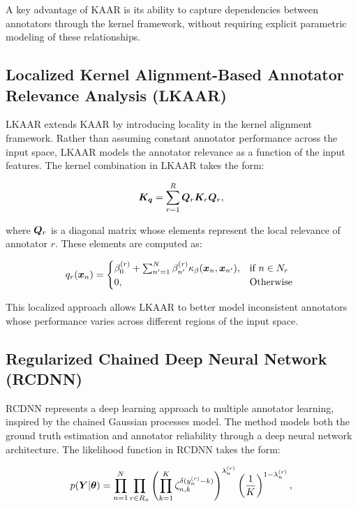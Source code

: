 A key advantage of KAAR is its ability to capture dependencies
between annotators through the kernel framework, without requiring
explicit parametric modeling of these relationships.

\subsection{Localized Kernel Alignment-Based Annotator Relevance
Analysis (LKAAR)}

LKAAR extends KAAR by introducing locality in the kernel alignment
framework. Rather than assuming constant annotator performance across
the input space, LKAAR models the annotator relevance as a function
of the input features. The kernel combination in LKAAR takes the form:

\begin{equation}
  {\bm{K}}_{{\bm{q}}} =\sum_{r=1}^{R}{\bm{Q}}_r{\bm{K}}_r{\bm{Q}}_r,
\end{equation}

where ${\bm{Q}}_r$ is a diagonal matrix whose elements represent the
local relevance of annotator $r$. These elements are computed as:

\begin{align}
  q_r({\bm{x}}_n) =
  \begin{cases}
    \beta_0^{(r)} + \sum_{n^{\prime}=1}^{N}\beta_{n^{\prime}}^{(r)}
    \kappa_{\beta}({\bm{x}}_n,{\bm{x}}_{n^{\prime}}), & \mbox{if } n\in N_r\\
    0, & \mbox{Otherwise }
  \end{cases}
\end{align}

This localized approach allows LKAAR to better model inconsistent
annotators whose performance varies across different regions of the input space.

\subsection{Regularized Chained Deep Neural Network (RCDNN)}

RCDNN represents a deep learning approach to multiple annotator
learning, inspired by the chained Gaussian processes model. The
method models both the ground truth estimation and annotator
reliability through a deep neural network architecture. The
likelihood function in RCDNN takes the form:

\begin{align}
  p({\bm{Y}}|\bm{\theta}) = \prod_{n=1}^{N}\prod_{r\in R_n}
  \left(\prod_{k=1}^{K}\zeta_{n,k}^{\delta(y_n^{(r)}-k)}\right)^{\lambda_n^{(r)}}\left(\frac{1}{K}\right)^{1-\lambda_n^{(r)}},
\end{align}


